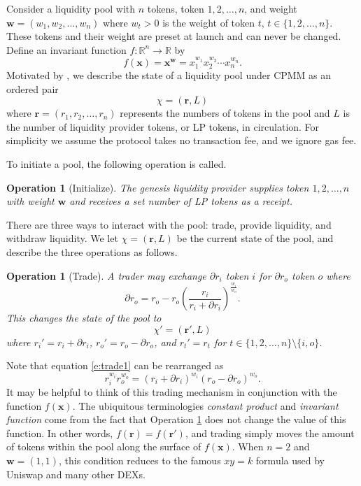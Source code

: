 \documentclass[12pt,a4paper]{article}
\newtheorem{operation}[corollary]{Operation}
\begin{document}
Consider a liquidity pool with $n$ tokens, token $1,2,\ldots,n$, and weight $\mathbf{w}=(w_1,w_2,\ldots,w_n)$ where $w_t>0$ is the weight of token $t$, $t\in\{1,2,\ldots,n\}$. These tokens and their weight are preset at launch and can never be changed. Define an invariant function $f:\mathbb{R}^n\rightarrow\mathbb{R}$ by
\[f(\mathbf{x})=\mathbf{x}^\mathbf{w}=x_1^{w_1}x_2^{w_2}\cdots x_n^{w_n}.\]
Motivated by \cite{XPCF}, we describe the state of a liquidity pool under CPMM as an ordered pair
\[\chi=(\mathbf{r},L)\]
where $\mathbf{r}=(r_1,r_2,\ldots,r_n)$ represents the numbers of tokens in the pool and $L$ is the number of liquidity provider tokens, or LP tokens, in circulation. For simplicity we assume the protocol takes no transaction fee, and we ignore gas fee.

To initiate a pool, the following operation is called.

\begin{operation}[Initialize]
The genesis liquidity provider supplies token $1,2,\ldots,n$ with weight $\mathbf{w}$ and receives a set number of LP tokens as a receipt.
\end{operation}

There are three ways to interact with the pool: trade, provide liquidity, and withdraw liquidity. We let $\chi=(\mathbf{r},L)$ be the current state of the pool, and describe the three operations as follows.

\begin{operation}[Trade]\label{o:trade1}
A trader may exchange $\partial r_i$ token $i$ for $\partial r_o$ token $o$ where
\begin{equation}\label{e:trade1}
\partial r_o=r_o-r_o\left(\frac{r_i}{r_i+\partial r_i}\right)^\frac{w_i}{w_o}.
\end{equation}
This changes the state of the pool to
\[\chi'=(\mathbf{r'},L)\]
where $r_i'=r_i+\partial r_i$, $r_o'=r_o-\partial r_o$, and $r_t'=r_t$ for $t\in\{1,2,\ldots,n\}\setminus\{i,o\}$.
\end{operation}

Note that equation \eqref{e:trade1} can be rearranged as
\[r_i^{w_i}r_o^{w_o}=(r_i+\partial r_i)^{w_i}(r_o-\partial r_o)^{w_o}.\]
It may be helpful to think of this trading mechanism in conjunction with the function $f(\mathbf{x})$. The ubiquitous terminologies \emph{constant product} and \emph{invariant function} come from the fact that Operation \ref{o:trade1} does not change the value of this function. In other words, $f(\mathbf{r})=f(\mathbf{r'})$, and trading simply moves the amount of tokens within the pool along the surface of $f(\mathbf{x})$. When $n=2$ and $\mathbf{w}=(1,1)$, this condition reduces to the famous $xy=k$ formula used by Uniswap and many other DEXs.
\end{document}
